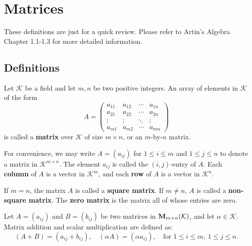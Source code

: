 \chapter{Matrices}

These definitions are just for a quick review. Please refer to Artin's Algebra Chapter 1.1-1.3 for more detailed information.

\section{Definitions}

\begin{definitionenv}
	Let $\mathcal{K}$ be a field and let $m, n$ be two positive integers.
	An array of elements in $\mathcal{K}$ of the form
	\[
	A =
	\begin{pmatrix}
		a_{11} & a_{12} & \cdots & a_{1n} \\
		a_{21} & a_{22} & \cdots & a_{2n} \\
		\vdots & \vdots & \ddots & \vdots \\
		a_{m1} & a_{m2} & \cdots & a_{mn}
	\end{pmatrix}
	\]
	is called a \textbf{matrix} over $\mathcal{K}$ of size $m \times n$, or an $m$-by-$n$ matrix.
\end{definitionenv}

\begin{definitionenv}
	For convenience, we may write $A = (a_{ij})$ for $1 \leq i \leq m$ and $1 \leq j \leq n$ to denote a matrix in $\mathcal{K}^{m \times n}$.
	The element $a_{ij}$ is called the $(i,j)$-entry of $A$.
	Each \textbf{column} of $A$ is a vector in $\mathcal{K}^m$, and each \textbf{row} of $A$ is a vector in $\mathcal{K}^n$.
\end{definitionenv}


\begin{definitionenv}
	If $m = n$, the matrix $A$ is called a \textbf{square matrix}.
	If $m \neq n$, $A$ is called a \textbf{non-square matrix}.
	The \textbf{zero matrix} is the matrix all of whose entries are zero.
\end{definitionenv}

\begin{definitionenv}
	Let $A = (a_{ij})$ and $B = (b_{ij})$ be two matrices in $\mathbf{M}_{m \times n}(\mathcal{K})$, and let $\alpha \in \mathcal{K}$.
	Matrix addition and scalar multiplication are defined as:
	\[
	(A + B) = (a_{ij} + b_{ij}), \quad
	(\alpha A) = (\alpha a_{ij}), \quad
	\text{for } 1 \leq i \leq m, \ 1 \leq j \leq n.
	\]
\end{definitionenv}

